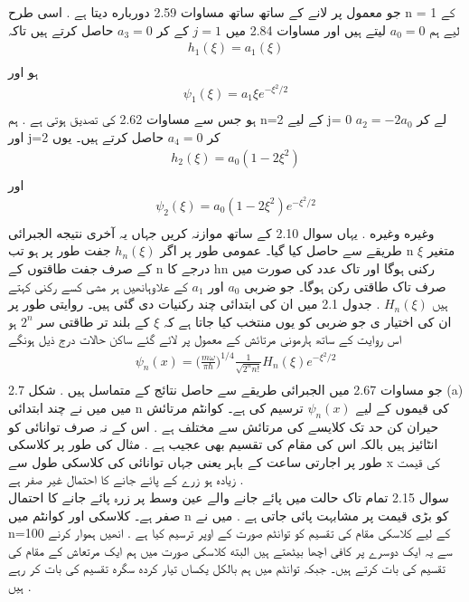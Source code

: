 \documentclass{book}
\begin{document}
جو معمول پر لانے کے ساتھ ساتھ مساوات 2.59
دورباره دیتا ہے . اسی طرح n = 1 کے لیے ہم
\(a_{0}=0\)
لیتے ہیں اور مساوات 2.84 میں
\(j=1\)
کے کر
\(a_{3}=0\)
حاصل کرتے ہیں تاکہ
\begin{align*}
h_{1}(\xi)=a_{1}(\xi)\\
\end{align*}
ہو
اور
\begin{align*}
\psi_{1}(\xi)=a_{1}\xi e^{-\xi^{2}/2}\\
\end{align*}
ہو جس سے مساوات 2.62 کی تصدیق ہوتی ہے . ہم
n=2
کے لیے
j= 0
لے کر
\(a_{2}=-2a_{0}\)
اور
j=2
کر
\(a_{4}=0\)
حاصل کرتے ہیں۔ یوں
\begin{align*}
h_{2}(\xi)=a_{0}(1-2\xi^{2})\\
\end{align*}
اور
\begin{align*}
\psi_{2}(\xi)=a_{0}(1-2\xi^{2})e^{-\xi^{2}/2}\\
\end{align*}
وغیره وغیره . یہاں سوال 2.10 کے ساتھ موازنہ کریں جہاں یہ آخری نتیجه الجبرائی طریقے سے حاصل کیا گیا۔ عمومی طور پر اگر
\(h_{n}(\xi)\)
جفت طور پر ہو تب
n
متغیر
\(\xi\)
کے صرف جفت طاقتوں کے
n
درجے کا
hn
رکنی ہوگا اور تاک عدد کی صورت میں صرف تاک طاقتی رکن ہوگا۔ جو ضربی
\(a_{0}\)
اور
\(a_{1}\)
کے علاوہانھیں ہر مشی کسے رکنی کہتے ہیں
\(H_{n}(\xi)\)
 . جدول 2.1 میں ان کی ابتدائی چند رکنیات دی گئی ہیں۔ روایتی طور پر ان کی اختیار ی جو ضربی کو یوں منتخب کیا جاتا ہے کہ
\(\xi\)
کے بلند تر طاقتی سر
\(2^{n}\)
ہو اس روایت کے ساتھ ہارمونی مرتائش کے معمول پر لائے گئے ساکن حالات درج ذیل ہونگے
\begin{align*}
\psi_{n}(x)=\big (\frac{m\omega}{\pi\hbar}\big )^{1/4}\frac{1}{\sqrt{2^{n}n!}}H_{n}(\xi)e^{-\xi^{2}/2}\\
\end{align*}
جو مساوات 2.67 میں الجبرائی طریقے سے حاصل نتائج کے متماسل ہیں . شکل 2.7 (a) میں میں نے چند ابتدائی n کی قیموں کے لیے
\(\psi_{n}(x)\)
ترسیم کی ہے۔ کوانٹم مرتائش حیران کن حد تک کلایسے کی مرتائش سے مختلف ہے . اس کے نہ صرف توانائی کو انٹائیز ہیں بالکہ اس کی مقام کی تقسیم بھی عجیب ہے . مثال کی طور پر کلاسکی طور پر اجارتی ساعت کے باہر یعنی جہاں توانائی کی کلاسکی طول سے
x
 کی قیمت زیادہ ہو زرے کے پائے جانے کا احتمال غیر صفر ہے .\\
سوال 
2.15
تمام تاک حالت میں پائے جانے والے عین وسط پر زرہ پائے جانے کا احتمال صفر ہے۔ کلاسکی اور کوانٹم میں
n
کو بڑی قیمت پر مشابہت پائی جاتی ہے . میں نے n=100 کے لیے کلاسکی مقام کی تقسیم کو توانٹم صورت کے اوپر ترسیم کیا ہے . انھیں ہموار کرنے سے یہ ایک دوسرے پر کافی اچھا بیٹھتے ہیں البته کلاسکی صورت میں ہم ایک مرتعاش کے مقام کی تقسیم کی بات کرتے ہیں۔ جبکہ توانٹم میں ہم بالکل یکساں تیار کرده سگره تقسیم کی بات کر رہے ہیں .
\end{document}
